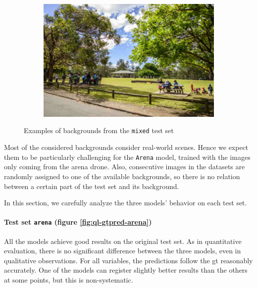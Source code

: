 \begin{figure}[!h]
\begin{center}
\begin{subfigure}[h]{0.24\textwidth}
		\end{subfigure}
		\hfill
		\begin{subfigure}[h]{0.24\textwidth}
			\centering
			\includegraphics[width=1\textwidth]{"contents/images/06-img-park"}
		\end{subfigure}
	\end{center}
	\vspace{-0.5cm}
	\caption[Examples of backgrounds from the \texttt{mixed} test set]{Examples of backgrounds from the \texttt{mixed} test set}
	\label{fig:ql-mixedset}
\end{figure}

Most of the considered backgrounds consider real-world scenes. Hence we expect them to be particularly challenging for the \texttt{Arena} model, trained with the images only coming from the arena drone. Also, consecutive images in the datasets are randomly assigned to one of the available backgrounds, so there is no relation between a certain part of the test set and its background.

In this section, we carefully analyze the three models' behavior on each test set.


\paragraph*{Test set \texttt{arena} (figure \ref{fig:ql-gtpred-arena})}

All the models achieve good results on the original test set. As in quantitative evaluation, there is no significant difference between the three models, even in qualitative observations. For all variables, the predictions follow the \gls{gt} reasonably accurately. One of the models can register slightly better results than the others at some points, but this is non-systematic.

